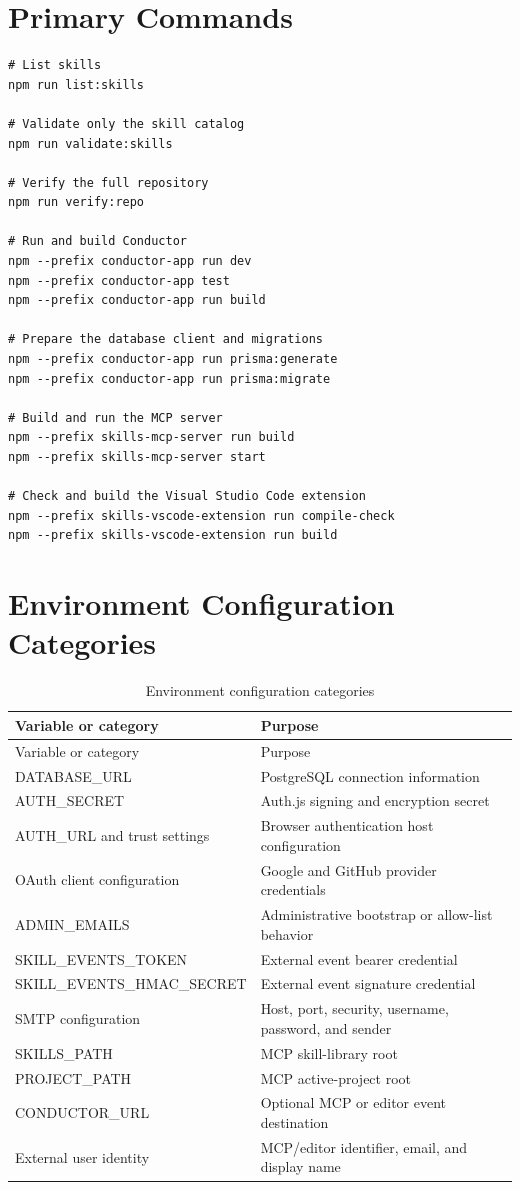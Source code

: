 \documentclass[12pt]{report}
\begin{document}
\chapter{Primary Commands}

\begin{verbatim}
# List skills
npm run list:skills

# Validate only the skill catalog
npm run validate:skills

# Verify the full repository
npm run verify:repo

# Run and build Conductor
npm --prefix conductor-app run dev
npm --prefix conductor-app test
npm --prefix conductor-app run build

# Prepare the database client and migrations
npm --prefix conductor-app run prisma:generate
npm --prefix conductor-app run prisma:migrate

# Build and run the MCP server
npm --prefix skills-mcp-server run build
npm --prefix skills-mcp-server start

# Check and build the Visual Studio Code extension
npm --prefix skills-vscode-extension run compile-check
npm --prefix skills-vscode-extension run build
\end{verbatim}

\chapter{Environment Configuration Categories}

\begin{longtable}{p{}p{}}
\caption{Environment configuration categories}\label{tab:environment}\\
\toprule
Variable or category & Purpose \\
\midrule
\endfirsthead
\toprule
Variable or category & Purpose \\
\midrule
\endhead
DATABASE\_URL & PostgreSQL connection information \\
AUTH\_SECRET & Auth.js signing and encryption secret \\
AUTH\_URL and trust settings & Browser authentication host configuration \\
OAuth client configuration & Google and GitHub provider credentials \\
ADMIN\_EMAILS & Administrative bootstrap or allow-list behavior \\
SKILL\_EVENTS\_TOKEN & External event bearer credential \\
SKILL\_EVENTS\_HMAC\_SECRET & External event signature credential \\
SMTP configuration & Host, port, security, username, password, and sender \\
SKILLS\_PATH & MCP skill-library root \\
PROJECT\_PATH & MCP active-project root \\
CONDUCTOR\_URL & Optional MCP or editor event destination \\
External user identity & MCP/editor identifier, email, and display name \\
\bottomrule
\end{longtable}
\end{document}
